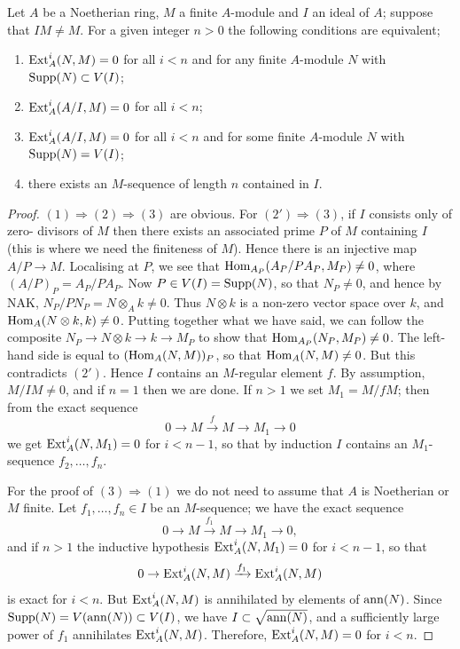 \begin{theorem}\label{thm:16.6}
Let $A$ be a Noetherian ring, $M$ a finite $A$-module and $I$
an ideal of $A$; suppose that $IM \neq M$. For a given integer $n > 0$ the following
conditions are equivalent;
\begin{enumerate}[(1)]
  \item $\operatorname{Ext}^i_A(N, M) = 0$ for all $i < n$ and for any finite $A$-module $N$ with
        $\operatorname{Supp}(N) \subset V(I)$;
  \item $\operatorname{Ext}^i_A(A/I, M) = 0$ for all $i < n$;
  \item $\operatorname{Ext}^i_A(A/I, M) = 0$ for all $i < n$ and for some finite $A$-module $N$ with
        $\operatorname{Supp}(N) = V(I)$;
  \item there exists an $M$-sequence of length $n$ contained in $I$.
\end{enumerate}
\end{theorem}

\begin{proof}
$(1) \Rightarrow (2) \Rightarrow (3)$ are obvious. For $(2') \Rightarrow (3)$, if $I$ consists only of zero-
divisors of $M$ then there exists an associated prime $P$ of $M$ containing $I$
(this is where we need the finiteness of $M$). Hence there is an injective
map $A/P \to M$. Localising at $P$, we see that $\operatorname{Hom}_{A_P}(A_P/PA_P, M_P) \neq 0$, where
$(A/P)_P = A_P/PA_P$. Now $P \in V(I) = \operatorname{Supp}(N)$, so that $N_P \neq 0$, and hence by
NAK, $N_P/PN_P = N \otimes_A k \neq 0$. Thus $N \otimes k$ is a non-zero vector space
over $k$, and $\operatorname{Hom}_A(N \otimes k, k) \neq 0$. Putting together what we have said,
we can follow the composite $N_P \to N \otimes k \to k \to M_P$ to show that
$\operatorname{Hom}_{A_P}(N_P, M_P) \neq 0$. The left-hand side is equal to $(\operatorname{Hom}_A(N, M))_P$, so that
$\operatorname{Hom}_A(N, M) \neq 0$. But this contradicts $(2')$. Hence $I$ contains an
$M$-regular element $f$. By assumption, $M/IM \neq 0$, and if $n = 1$ then we are
done. If $n > 1$ we set $M_1 = M/fM$; then from the exact sequence
\[
  0 \to M \xrightarrow{f} M \to M_1 \to 0
\]
we get $\operatorname{Ext}^i_A(N, M_1) = 0$ for $i < n - 1$, so that by induction $I$ contains an
$M_1$-sequence $f_2, \ldots, f_n$.

For the proof of $(3) \Rightarrow (1)$ we do not need to assume that $A$ is Noetherian
or $M$ finite. Let $f_1, \ldots, f_n \in I$ be an $M$-sequence; we have the exact sequence
\[
  0 \to M \xrightarrow{f_1} M \to M_1 \to 0,
\]
and if $n > 1$ the inductive hypothesis $\operatorname{Ext}^i_A(N, M_1) = 0$ for $i < n - 1$, so that
\[
  0 \to \operatorname{Ext}^i_A(N, M) \xrightarrow{f_1} \operatorname{Ext}^i_A(N, M)
\]
is exact for $i < n$. But $\operatorname{Ext}^i_A(N, M)$ is annihilated by elements of $\operatorname{ann}(N)$.
Since $\operatorname{Supp}(N) = V(\operatorname{ann}(N)) \subset V(I)$, we have $I \subset \sqrt{\operatorname{ann}(N)}$, and a
sufficiently large power of $f_1$ annihilates $\operatorname{Ext}^i_A(N, M)$. Therefore,
$\operatorname{Ext}^i_A(N, M) = 0$ for $i < n$.
\end{proof}

